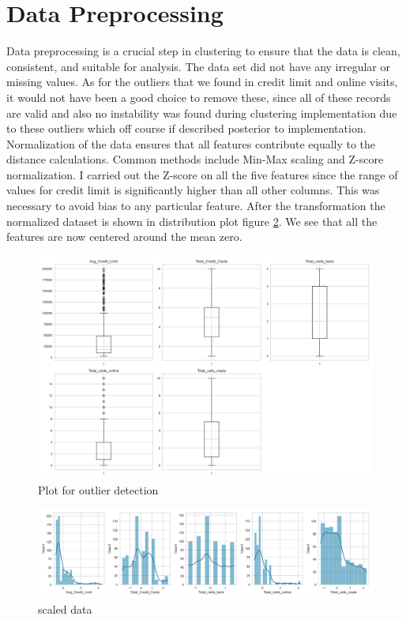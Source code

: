 \documentclass[10pt,a4paper]{style}
\begin{document}
	\section{Data Preprocessing}
		Data preprocessing is a crucial step in clustering to ensure that the data is clean, consistent, and suitable for analysis. The data set did not have any irregular or missing values. As for the outliers that we found in credit limit and online visits, it would not have been a good choice to remove these, since all of these records are valid and also no instability was found during clustering implementation due to these outliers which off course if described posterior to implementation. Normalization of the data ensures that all features contribute equally to the distance calculations. Common methods include Min-Max scaling and Z-score normalization. I carried out the Z-score on all the five features since the range of values for credit limit is significantly higher than all other columns. This was necessary to avoid bias to any particular feature. After the transformation the normalized dataset is shown in distribution plot figure \ref{fig:scaled_data}. We see that all the features are now centered around the mean zero.
		\begin{figure}[h]
			\centering
			\includegraphics[width=\linewidth]{outlier.png}
			\caption{Plot for outlier detection}
			\label{fig:outlier}
		\end{figure}
		\begin{figure}[h]
			\centering
			\includegraphics[width=\textwidth]{scaled_data.png}
			\caption{scaled data}
			\label{fig:scaled_data}
		\end{figure}
	\newpage
\end{document}
